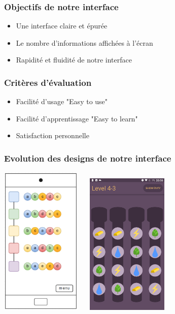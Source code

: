 \documentclass{beamer}
\begin{document}
\begin{frame}
\frametitle{Objectifs de notre interface}
\begin{itemize}
	\item Une interface claire et épurée
    \item Le nombre d'informations affichées à l'écran
    \item Rapidité et fluidité de notre interface
\end{itemize}
\end{frame}

\begin{frame}
\frametitle{Critères d'évaluation}
\begin{itemize}
	\item Facilité d'usage "Easy to use"
    \item Facilité d'apprentissage "Easy to learn"
    \item Satisfaction personnelle
\end{itemize}
\end{frame}

\begin{frame}
\frametitle{Evolution des designs de notre interface}
\begin{center}
\includegraphics[width=0.29\textwidth]{maquette}~
~
\includegraphics[width=0.29\textwidth]{g1}
\end{center}
\end{frame}
\end{document}
